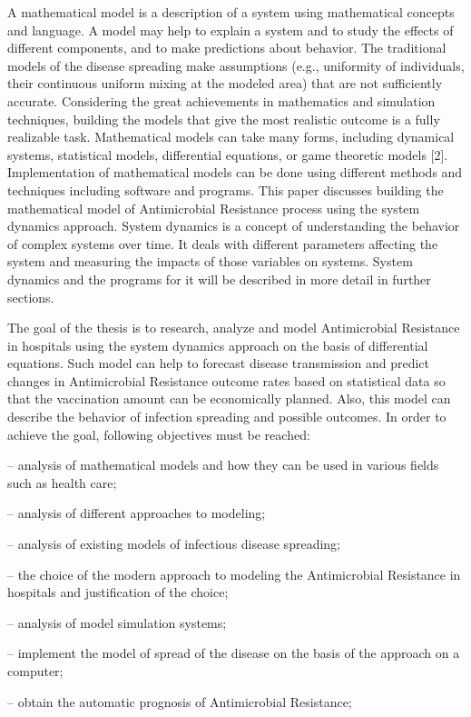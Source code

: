 A mathematical model is a description of a system using mathematical concepts and language. A model may help to explain a system and to study the effects of different components, and to make predictions about behavior. The traditional models of the disease spreading make assumptions (e.g., uniformity of individuals, their continuous uniform mixing at the modeled area) that are not sufficiently accurate. Considering the great achievements in mathematics and simulation techniques, building the models that give the most realistic outcome is a fully realizable task. Mathematical models can take many forms, including dynamical systems, statistical models, differential equations, or game theoretic models [2]. Implementation of mathematical models can be done using different methods and techniques including software and programs. This paper discusses building the mathematical model of Antimicrobial Resistance process using the system dynamics approach. System dynamics is a concept of understanding the behavior of complex systems over time. It deals with different parameters affecting the system and measuring the impacts of those variables on systems. System dynamics and the programs for it will be described in more detail in further sections.

The goal of the thesis is to research, analyze and model Antimicrobial Resistance in hospitals using the system dynamics approach on the basis of differential equations.  Such model can help to forecast disease transmission and predict changes in Antimicrobial Resistance outcome rates based on statistical data so that the vaccination amount can be economically planned. Also, this model can describe the behavior of infection spreading and possible outcomes. In order to achieve the goal, following objectives must be reached:

–	analysis of mathematical models and how they can be used in various fields such as health care;

–	analysis of different approaches to modeling;

–	analysis of existing models of infectious disease spreading;

–	the choice of the modern approach to modeling the Antimicrobial Resistance in hospitals and justification of the choice;

–	analysis of model simulation systems;

–	implement the model of spread of the disease on the basis of the approach on a computer;

–	obtain the automatic prognosis of Antimicrobial Resistance;

